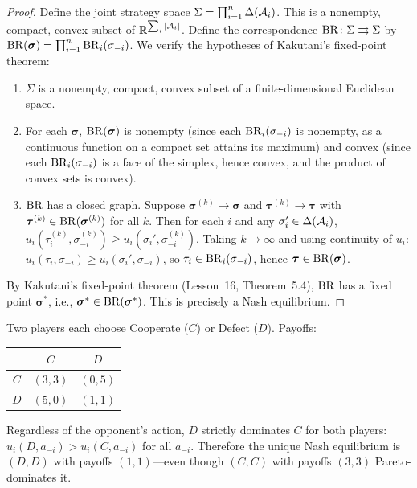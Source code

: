 \documentclass[11pt,a4paper]{article}
\begin{document}
\begin{proof}
Define the joint strategy space $\Sigma = \prod_{i=1}^n
\Delta(\mathcal{A}_i)$.  This is a nonempty, compact, convex subset of
$\mathbb{R}^{\sum_i |\mathcal{A}_i|}$.  Define the correspondence
$\mathrm{BR} \colon \Sigma \rightrightarrows \Sigma$ by
$\mathrm{BR}(\boldsymbol{\sigma}) = \prod_{i=1}^n \mathrm{BR}_i(\sigma_{-i})$.
We verify the hypotheses of Kakutani's fixed-point theorem:
\begin{enumerate}[nosep]
  \item $\Sigma$ is a nonempty, compact, convex subset of a
    finite-dimensional Euclidean space.
  \item For each $\boldsymbol{\sigma}$, $\mathrm{BR}(\boldsymbol{\sigma})$ is
    nonempty (since each $\mathrm{BR}_i(\sigma_{-i})$ is nonempty, as a
    continuous function on a compact set attains its maximum) and
    convex (since each $\mathrm{BR}_i(\sigma_{-i})$ is a face of the simplex,
    hence convex, and the product of convex sets is convex).
  \item $\mathrm{BR}$ has a closed graph.  Suppose
    $\boldsymbol{\sigma}^{(k)} \to \boldsymbol{\sigma}$ and
    $\boldsymbol{\tau}^{(k)} \to \boldsymbol{\tau}$ with
    $\boldsymbol{\tau}^{(k)} \in \mathrm{BR}(\boldsymbol{\sigma}^{(k)})$
    for all $k$.  Then for each $i$ and any
    $\sigma_i' \in \Delta(\mathcal{A}_i)$,
    $u_i(\tau_i^{(k)}, \sigma_{-i}^{(k)}) \geq
    u_i(\sigma_i', \sigma_{-i}^{(k)})$.  Taking $k \to \infty$ and
    using continuity of $u_i$:
    $u_i(\tau_i, \sigma_{-i}) \geq u_i(\sigma_i', \sigma_{-i})$,
    so $\tau_i \in \mathrm{BR}_i(\sigma_{-i})$, hence
    $\boldsymbol{\tau} \in \mathrm{BR}(\boldsymbol{\sigma})$.
\end{enumerate}
By Kakutani's fixed-point theorem (Lesson~16, Theorem~5.4),
$\mathrm{BR}$ has a fixed point $\boldsymbol{\sigma}^*$, i.e.,
$\boldsymbol{\sigma}^* \in \mathrm{BR}(\boldsymbol{\sigma}^*)$.  This is
precisely a Nash equilibrium.
\end{proof}

\begin{example}
\label{ex:prisoners-dilemma}
Two players each choose Cooperate ($C$) or Defect ($D$).  Payoffs:
\begin{center}
\begin{tabular}{c|cc}
  & $C$ & $D$ \\ \hline
  $C$ & $(3,3)$ & $(0,5)$ \\
  $D$ & $(5,0)$ & $(1,1)$
\end{tabular}
\end{center}
Regardless of the opponent's action, $D$ strictly dominates $C$
for both players: $u_i(D, a_{-i}) > u_i(C, a_{-i})$ for all
$a_{-i}$.  Therefore the unique Nash equilibrium is $(D, D)$ with
payoffs $(1, 1)$---even though $(C, C)$ with payoffs $(3, 3)$
Pareto-dominates it.
\end{example}
\end{document}
